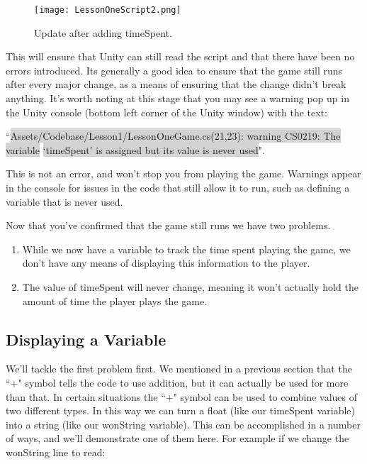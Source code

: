 \documentclass{article}
\begin{document}
\begin{figure}
  \texttt{[image: LessonOneScript2.png]}
  \caption{Update after adding timeSpent.}
  \label{fig:code2}
\end{figure}

\noindent{}

This will ensure that Unity can still read the script and that there have been no errors introduced. Its generally a good idea to ensure that the game still runs after every major change, as a means of ensuring that the change didn't break anything. It's worth noting at this stage that you may see a warning pop up in the Unity console (bottom left corner of the Unity window) with the text: 

``\colorbox{lightGray}{\color{GreenYellow}Assets/Codebase/Lesson1/LessonOneGame.cs(21,23): warning CS0219: The variable}\newline
\colorbox{lightGray}{\color{GreenYellow} `timeSpent' is assigned but its value is never used}". 

This is not an error, and won't stop you from playing the game. Warnings appear in the console for issues in the code that still allow it to run, such as defining a variable that is never used. 

Now that you've confirmed that the game still runs we have two problems. 
\begin{enumerate}
\item While we now have a variable to track the time spent playing the game, we don't have any means of displaying this information to the player. 
\item The value of timeSpent will never change, meaning it won't actually hold the amount of time the player plays the game. 
\end{enumerate}

\subsection{Displaying a Variable}

We'll tackle the first problem first. We mentioned in a previous section that the ``+" symbol tells the code to use addition, but it can actually be used for more than that. In certain situations the ``+" symbol can be used to combine values of two different types. In this way we can turn a float (like our timeSpent variable) into a string (like our wonString variable). This can be accomplished in a number of ways, and we'll demonstrate one of them here. For example if we change the wonString line to read: 
\end{document}
